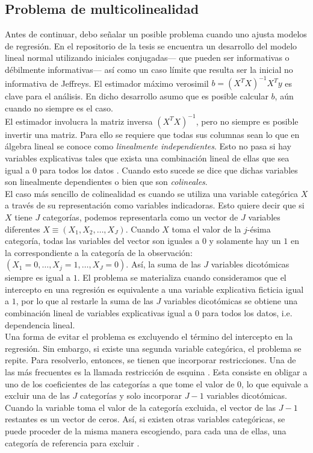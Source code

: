 \subsection{Problema de multicolinealidad} \label{prob_multicolinealidad}

Antes de continuar, debo señalar un posible problema cuando uno ajusta modelos de regresión. En el repositorio de la tesis se encuentra un desarrollo del modelo lineal normal utilizando iniciales conjugadas--- que pueden ser informativas o débilmente informativas--- así como un caso límite que resulta ser la inicial no informativa de Jeffreys. El estimador máximo verosimil $b=(X^TX)^{-1}X^Ty$ es clave para el análisis. En dicho desarrollo asumo que es posible calcular $b$, aún cuando no siempre es el caso.\\

El estimador involucra la matriz inversa $(X^TX)^{-1}$, pero no siempre es posible invertir una matriz. Para ello se requiere que todas sus columnas sean lo que en álgebra lineal se conoce como \textit{linealmente independientes}. Esto no pasa si hay variables explicativas tales que exista una combinación lineal de ellas que sea igual a $0$ para todos los datos \parencite{GelmanHill06}. Cuando esto sucede se dice que dichas variables son linealmente dependientes o bien que son \textit{colineales}.\\

El caso más sencillo de colinealidad es cuando se utiliza una variable categórica $X$ a través de su representación como variables indicadoras. Esto quiere decir que si $X$ tiene $J$ categorías, podemos representarla como un vector de $J$ variables diferentes $X \equiv (X_1,X_2,\dots,X_J)$. Cuando $X$ toma el valor de la $j$-ésima categoría, todas las variables del vector son iguales a $0$ y solamente hay un $1$ en la correspondiente a la categoría de la observación: $(X_1 = 0,\dots,X_j = 1,\dots,X_J=0)$. Así, la suma de las $J$ variables dicotómicas siempre es igual a $1$. El problema se materializa cuando consideramos que el intercepto en una regresión es equivalente a una variable explicativa ficticia igual a $1$, por lo que al restarle la suma de las $J$ variables dicotómicas se obtiene una combinación lineal de variables explicativas igual a $0$ para todos los datos, i.e. dependencia lineal.\\ 

Una forma de evitar el problema es excluyendo el término del intercepto en la regresión. Sin embargo, si existe una segunda variable categórica, el problema se repite. Para resolverlo, entonces, se tienen que incorporar restricciones. Una de las más frecuentes es la llamada restricción de esquina \parencite{Regueiro12}. Esta consiste en obligar a uno de los coeficientes de las categorías a que tome el valor de $0$, lo que equivale a excluir una de las $J$ categorías y solo incorporar $J-1$ variables dicotómicas. Cuando la variable toma el valor de la categoría excluida, el vector de las $J-1$ restantes es un vector de ceros. Así, si existen otras variables categóricas, se puede proceder de la misma manera escogiendo, para cada una de ellas, una categoría de referencia para excluir \parencite{GelmanHill06}.\\ 

